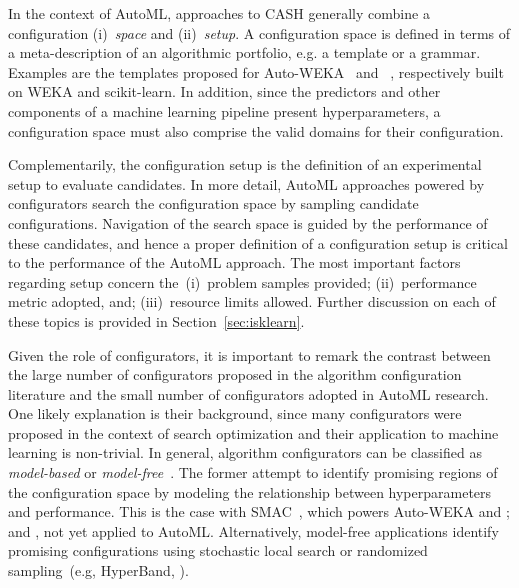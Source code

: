 In the context of AutoML, approaches to CASH generally combine a configuration (i)~\emph{space} and (ii)~\emph{setup}. A configuration space is defined in terms of a meta-description of an algorithmic portfolio, e.g. a template or a grammar. 
Examples are the templates proposed for Auto-WEKA~\cite{autoweka} and \autosklearn~\cite{auto-sklearn}, respectively built on WEKA and scikit-learn. 
In addition, since the predictors and other components of a machine learning pipeline present hyperparameters, a configuration space must also comprise the valid domains for their configuration. 

Complementarily, the configuration setup is the definition of an experimental setup to evaluate candidates. In more detail, AutoML approaches powered by configurators search the configuration space by sampling candidate configurations. Navigation of the search space is guided by the performance of these candidates, and hence a proper definition of a configuration setup is critical to the performance of the AutoML approach. The most important factors regarding setup concern the~(i)~problem samples provided; (ii)~performance metric adopted, and; (iii)~resource limits allowed. 
Further discussion on each of these topics is provided in Section~\ref{sec:isklearn}.

Given the role of configurators, it is important to remark the contrast between the large number of configurators proposed in the algorithm configuration literature and the small number of configurators adopted in AutoML research. One likely explanation is their background, since many configurators were proposed in the context of search optimization and their application to machine learning is non-trivial.
In general, algorithm configurators can be classified as \emph{model-based} or \emph{model-free}~\cite{BezLopStu2020}. The former attempt to identify promising regions of the configuration space by modeling the relationship between hyperparameters and performance. This is the case with SMAC~\cite{smac}, which powers Auto-WEKA and \autosklearn; and \irace, not yet applied to AutoML. Alternatively, model-free applications identify promising configurations using stochastic local search or randomized sampling~(e.g, HyperBand, \cite{li2017hyperband}).

\subsection{\irace}

